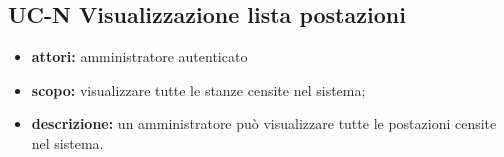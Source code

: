 \subsection{UC-N Visualizzazione lista postazioni}
\begin{itemize}
    \item \textbf{attori:} amministratore autenticato
    \item \textbf{scopo:} visualizzare tutte le stanze censite nel sistema;
    \item \textbf{descrizione:} un amministratore pu\`{o} visualizzare tutte le postazioni censite nel sistema.
\end{itemize}
